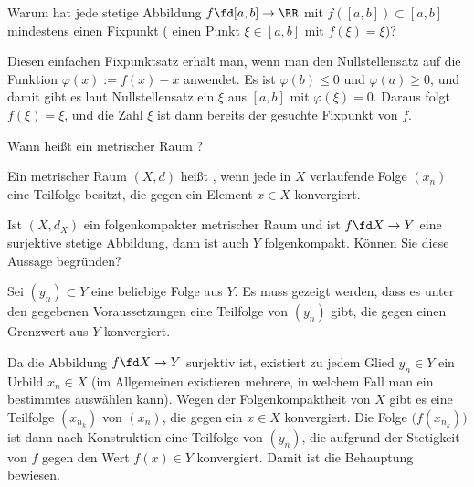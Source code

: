 \begin{frage}\label{03_fix}
  Warum hat jede stetige Abbildung $f\fd [a,b]\to \RR$ mit 
  $f([a,b])\subset [a,b]$ min\-des\-tens einen 
  Fixpunkt ({\dasheisst} einen 
  Punkt $\xi \in [a,b]$ mit $f(\xi)=\xi$)? 
\end{frage}

\begin{antwort}
  Diesen einfachen Fixpunktsatz erhält man, wenn man 
  den Nullstellensatz auf die Funktion 
  $\varphi(x):=f(x)-x$ anwendet.
  Es ist $\varphi(b)\le 0$ und $\varphi(a)\ge 0$, und damit gibt es laut 
  Nullstellensatz ein $\xi$ aus $[a,b]$ mit $\varphi(\xi)=0$. Daraus folgt 
  $f(\xi)=\xi$, und die Zahl $\xi$ 
  ist dann bereits der gesuchte Fixpunkt von $f$. 
  \AntEnd  
\end{antwort}


\begin{frage}
  Wann heißt ein metrischer Raum ?
\end{frage}

\begin{antwort}
  Ein metrischer Raum $(X,d)$ heißt , wenn jede 
  in $X$ verlaufende Folge $(x_n)$ eine Teilfolge besitzt, die gegen ein 
  Element $x\in X$ konvergiert.
  \AntEnd
\end{antwort}

\begin{frage}\label{03_komp}
  Ist $(X,d_X)$ ein folgenkompakter metrischer Raum 
  und ist $f\fd X\to Y$ eine surjektive stetige Abbildung, 
  dann ist auch $Y$ folgenkompakt. Können Sie diese Aussage begründen?
\end{frage}

\begin{antwort}
  Sei $(y_n) \subset Y$ eine beliebige Folge aus $Y$. Es muss gezeigt werden, 
  dass es unter den gegebenen Voraussetzungen eine Teilfolge von $(y_n)$ gibt, 
  die gegen einen Grenzwert aus $Y$ konvergiert.
  
  Da die Abbildung $f\fd X\to Y$ surjektiv ist, 
  existiert zu jedem Glied $y_n \in Y$ ein Urbild $x_n\in X$ (im Allgemeinen  
  existieren mehrere, in welchem Fall man ein bestimmtes auswählen kann). 
  Wegen der Folgenkompaktheit von $X$ gibt es eine Teilfolge 
  $(x_{n_k})$ von $(x_n)$, die gegen ein $x\in X$ konvergiert. 
  Die Folge $\big(f(x_{n_k})\big)$ ist dann nach Konstruktion eine Teilfolge von 
  $(y_n)$, die aufgrund der Stetigkeit von $f$ gegen den Wert $f(x)\in Y$ 
  konvergiert. Damit ist die Behauptung bewiesen. \AntEnd
\end{antwort}

